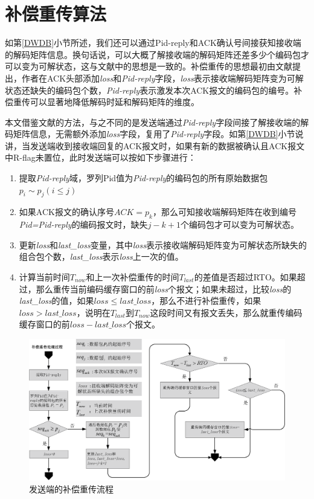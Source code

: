 \section{补偿重传算法}
如第\ref{DWDB}小节所述，我们还可以通过Pid-reply和ACK确认号间接获知接收端的解码矩阵信息。换句话说，可以大概了解接收端的解码矩阵还差多少个编码包才可以变为可解状态，这与文献\cite{song2011self}中的思想是一致的。补偿重传的思想最初由文献\cite{5403816}提出，作者在ACK头部添加\emph{loss}和\emph{Pid-reply}字段，\emph{loss}表示接收端解码矩阵变为可解状态还缺失的编码包个数，\emph{Pid-reply}表示激发本次ACK报文的编码包的编号。补偿重传可以显著地降低解码时延和解码矩阵的维度。
\par
本文借鉴文献\cite{5403816}的方法，与之不同的是发送端通过\emph{Pid-reply}字段间接了解接收端的解码矩阵信息，无需额外添加\emph{loss}字段，复用了\emph{Pid-reply}字段。如第\ref{DWDB}小节说讲，当发送端收到接收端回复的ACK报文时，如果有新的数据被确认且ACK报文中R-flag未置位，此时发送端可以按如下步骤进行：
\begin{enumerate}[fullwidth,itemindent=2em,label=(\arabic*)]
	\item 提取\emph{Pid-reply}域，罗列Pid值为\emph{Pid-reply}的编码包的所有原始数据包$p_i \sim p_j\left(i \le j\right)$
	\item 如果ACK报文的确认序号$ACK=p_k$，那么可知接收端解码矩阵在收到编号\emph{Pid=Pid-reply}的编码报文时，缺失$j-k+1$个编码包才可以变为可解状态。
	\item 更新\emph{loss}和\emph{last\_loss}变量，其中\emph{loss}表示接收端解码矩阵变为可解状态所缺失的组合包个数，\emph{last\_loss}表示\emph{loss}上一次的值。
	\item 计算当前时间$T_{now}$和上一次补偿重传的时间$T_{last}$的差值是否超过RTO。如果超过，那么重传当前编码缓存窗口的前\emph{loss}个报文；如果未超过，比较\emph{loss}的\emph{last\_loss}的值，如果$loss \le last\_loss$，那么不进行补偿重传，如果$loss > last\_loss$，说明在$T_{last}$到$T_{now}$这段时间又有报文丢失，那么就重传编码缓存窗口的前$loss-last\_loss$个报文。
\end{enumerate}
\begin{figure}[htbp]
	\centering
	\includegraphics[width=6in]{figures/bccc.eps}
	\caption{发送端的补偿重传流程}
	\label{BCCC_EPS}
\end{figure}
